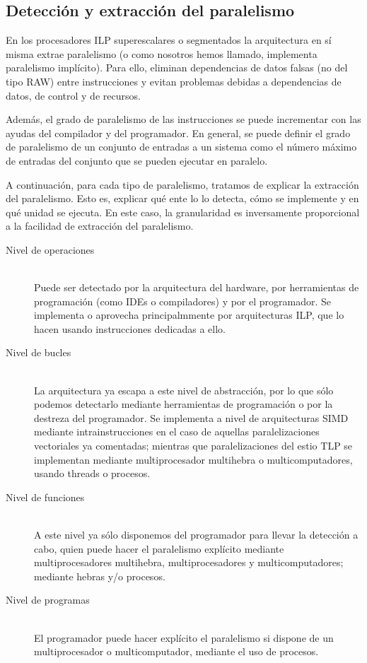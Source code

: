\subsection{Detección y extracción del paralelismo}
En los procesadores ILP superescalares o segmentados la arquitectura en sí misma extrae paralelismo (o como nosotros hemos llamado, implementa paralelismo implícito). Para ello, eliminan dependencias de datos falsas (no del tipo RAW) entre instrucciones y evitan problemas debidas a dependencias de datos, de control y de recursos.

Además, el grado de paralelismo de las instrucciones se puede incrementar con las ayudas del compilador y del programador. En general, se puede definir el grado de paralelismo de un conjunto de entradas a un sistema como el número máximo de entradas del conjunto que se pueden ejecutar en paralelo. 

A continuación, para cada tipo de paralelismo, tratamos de explicar la extracción del paralelismo. Esto es, explicar qué ente lo lo detecta, cómo se implemente y en qué unidad se ejecuta. En este caso, la granularidad es inversamente proporcional a la facilidad de extracción del paralelismo.
\begin{description}
    \item [Nivel de operaciones]~\\
        Puede ser detectado por la arquitectura del hardware, por herramientas de programación (como IDEs o compiladores) y por el programador. Se implementa o aprovecha principalmmente por arquitecturas ILP, que lo hacen usando instrucciones dedicadas a ello.
    \item [Nivel de bucles]~\\
        La arquitectura ya escapa a este nivel de abstracción, por lo que sólo podemos detectarlo mediante herramientas de programación o por la destreza del programador. Se implementa a nivel de arquitecturas SIMD mediante intrainstrucciones en el caso de aquellas paralelizaciones vectoriales ya comentadas; mientras que paralelizaciones del estio TLP se implementan mediante multiprocesador multihebra o multicomputadores, usando threads o procesos.
    \item [Nivel de funciones]~\\
        A este nivel ya sólo disponemos del programador para llevar la detección a cabo, quien puede hacer el paralelismo explícito mediante multiprocesadores multihebra, multiprocesadores y multicomputadores; mediante hebras y/o procesos.
    \item [Nivel de programas]~\\
        El programador puede hacer explícito el paralelismo si dispone de un multiprocesador o multicomputador, mediante el uso de procesos.
\end{description}

